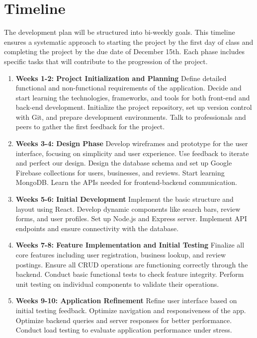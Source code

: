 \documentclass[10pt,twocolumn]{article}
\begin{document}
    \section{Timeline}
    The development plan will be structured into bi-weekly goals. This timeline ensures a systematic approach to starting the project by the first day of class and completing the project by the due date of December 15th. Each phase includes specific tasks that will contribute to the progression of the project.
    \begin{enumerate}
        \item \textbf{Weeks 1-2: Project Initialization and Planning} Define detailed functional and non-functional requirements of the application. Decide and start learning the technologies, frameworks, and tools for both front-end and back-end development. Initialize the project repository, set up version control with Git, and prepare development environments. Talk to professionals and peers to gather the first feedback for the project.

        \item \textbf{Weeks 3-4: Design Phase} Develop wireframes and prototype for the user interface, focusing on simplicity and user experience. Use feedback to iterate and perfect our design. Design the database schema and set up Google Firebase collections for users, businesses, and reviews. Start learning MongoDB. Learn the APIs needed for frontend-backend communication.

        \item \textbf{Weeks 5-6: Initial Development} Implement the basic structure and layout using React. Develop dynamic components like search bars, review forms, and user profiles. Set up Node.js and Express server. Implement API endpoints and ensure connectivity with the database.

        \item \textbf{Weeks 7-8: Feature Implementation and Initial Testing} Finalize all core features including user registration, business lookup, and review postings. Ensure all CRUD operations are functioning correctly through the backend. Conduct basic functional tests to check feature integrity. Perform unit testing on individual components to validate their operations.

        \item \textbf{Weeks 9-10: Application Refinement} Refine user interface based on initial testing feedback. Optimize navigation and responsiveness of the app. Optimize backend queries and server responses for better performance. Conduct load testing to evaluate application performance under stress.


\end{enumerate}
\end{document}
